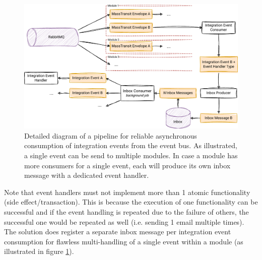 \begin{figure} [H]
    \centering
    \includegraphics[width=\textwidth]{figures/mm-consume-pipeline.pdf}
    \caption{Detailed diagram of a pipeline for reliable asynchronous consumption of integration events from the event bus. As illustrated, a single event can be send to multiple modules. In case a module has more consumers for a single event, each will produce its own inbox message with a dedicated event handler.}
    \label{fig:mm_consume_pipeline}
\end{figure}

Note that event handlers must not implement more than 1 atomic functionality (side effect/transaction). This is because the execution of one functionality can be successful and if the event handling is repeated due to the failure of others, the successful one would be repeated as well (i.e. sending 1 email multiple times). The solution does register a separate inbox message per integration event consumption for flawless multi-handling of a single event within a module (as illustrated in figure \ref{fig:mm_consume_pipeline}).

\newpage
